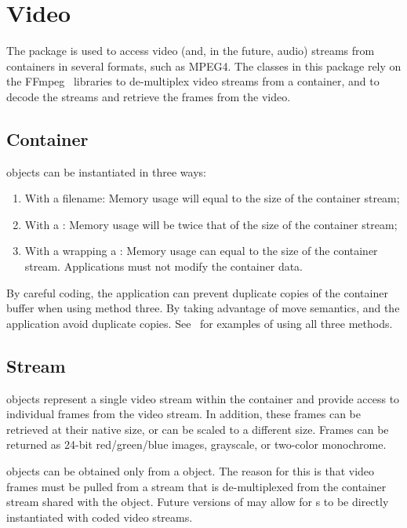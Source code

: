 %
%
\chapter{Video}
\label{chp-video}

The  package is used to access video (and, in the future,
audio) streams from containers in several formats, such as MPEG4. The classes
in this package rely on the FFmpeg~\cite{libffmpeg} libraries to de-multiplex
video streams from a container, and to decode the streams and retrieve the
frames from the video.

\section{Container}
\label{sec-videocontainer}

 objects can be instantiated in three ways:
\begin{enumerate}
\item With a filename: Memory usage will equal to the size of the container
stream;
\item With a : Memory usage will be twice that of
the size of the container stream;
\item With a  wrapping a :
Memory usage can equal to the size of the container stream. Applications
must not modify the container data.
\end{enumerate}

By careful coding, the application can prevent duplicate copies of the container
buffer when using method three. By taking advantage of \CppXI move semantics,
\sname and the application avoid duplicate copies.
See~ for examples of using all three methods.

\section{Stream}
\label{sec-videostream}

 objects represent a single video stream within the container
and provide access to individual frames from the video stream. In addition,
these frames can be retrieved at their native size, or can be scaled to a
different size. Frames can be returned as 24-bit red/green/blue images,
grayscale, or two-color monochrome.

 objects can be obtained only from a  object.
The reason for this is that video frames must be pulled from a stream that
is de-multiplexed from the container stream shared with the 
object. Future versions of \sname may allow for s to be directly
instantiated with coded video streams.

